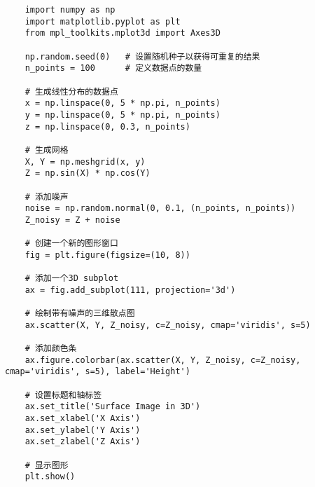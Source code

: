\documentclass{article}
\begin{document}
\clearpage
{}
\begin{lstlisting}
	import numpy as np
	import matplotlib.pyplot as plt
	from mpl_toolkits.mplot3d import Axes3D
	
	np.random.seed(0)	# 设置随机种子以获得可重复的结果
	n_points = 100		# 定义数据点的数量
	
	# 生成线性分布的数据点
	x = np.linspace(0, 5 * np.pi, n_points)
	y = np.linspace(0, 5 * np.pi, n_points)
	z = np.linspace(0, 0.3, n_points)
	
	# 生成网格
	X, Y = np.meshgrid(x, y)
	Z = np.sin(X) * np.cos(Y)
	
	# 添加噪声
	noise = np.random.normal(0, 0.1, (n_points, n_points))
	Z_noisy = Z + noise
	
	# 创建一个新的图形窗口
	fig = plt.figure(figsize=(10, 8))
	
	# 添加一个3D subplot
	ax = fig.add_subplot(111, projection='3d')
	
	# 绘制带有噪声的三维散点图
	ax.scatter(X, Y, Z_noisy, c=Z_noisy, cmap='viridis', s=5)
	
	# 添加颜色条
	ax.figure.colorbar(ax.scatter(X, Y, Z_noisy, c=Z_noisy, cmap='viridis', s=5), label='Height')
	
	# 设置标题和轴标签
	ax.set_title('Surface Image in 3D')
	ax.set_xlabel('X Axis')
	ax.set_ylabel('Y Axis')
	ax.set_zlabel('Z Axis')
	
	# 显示图形
	plt.show()
\end{lstlisting}

	
\end{document}
